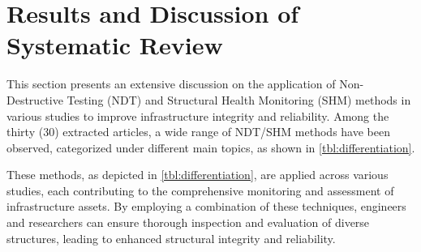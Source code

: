 \documentclass[journal, a4paper]{IEEEtran}
\begin{document}
\section{Results and Discussion of Systematic Review}
This section presents an extensive discussion on the application of Non-Destructive Testing (NDT) and
Structural Health Monitoring (SHM) methods in various studies to improve infrastructure integrity and reliability.
Among the thirty (30) extracted articles, a wide range of NDT/SHM methods have been observed,
categorized under different main topics, as shown in \autoref{tbl:differentiation}.

These methods, as depicted in \autoref{tbl:differentiation}, are applied across various studies,
each contributing to the comprehensive monitoring and assessment of infrastructure assets.
By employing a combination of these techniques, engineers and researchers can ensure thorough inspection and evaluation
of diverse structures, leading to enhanced structural integrity and reliability.
\end{document}
